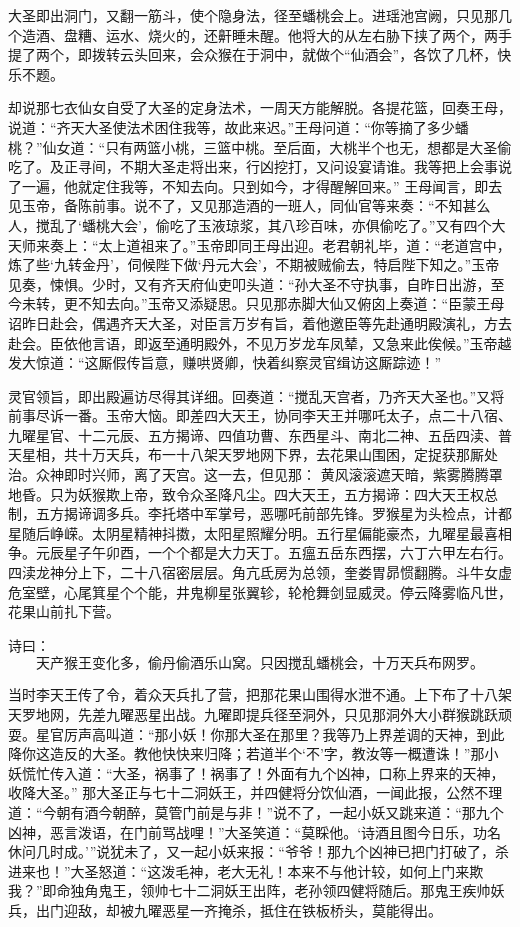 \documentclass[12pt]{lsbook}
\begin{document}
大圣即出洞门，又翻一筋斗，使个隐身法，径至蟠桃会上。进瑶池宫阙，只见那几个造酒、盘糟、运水、烧火的，还鼾睡未醒。他将大的从左右胁下挟了两个，两手提了两个，即拨转云头回来，会众猴在于洞中，就做个“仙酒会”，各饮了几杯，快乐不题。

却说那七衣仙女自受了大圣的定身法术，一周天方能解脱。各提花篮，回奏王母，说道：“齐天大圣使法术困住我等，故此来迟。”王母问道：“你等摘了多少蟠桃？”仙女道：“只有两篮小桃，三篮中桃。至后面，大桃半个也无，想都是大圣偷吃了。及正寻间，不期大圣走将出来，行凶挖打，又问设宴请谁。我等把上会事说了一遍，他就定住我等，不知去向。只到如今，才得醒解回来。” 王母闻言，即去见玉帝，备陈前事。说不了，又见那造酒的一班人，同仙官等来奏：“不知甚么人，搅乱了‘蟠桃大会’，偷吃了玉液琼浆，其八珍百味，亦俱偷吃了。”又有四个大天师来奏上：“太上道祖来了。”玉帝即同王母出迎。老君朝礼毕，道：“老道宫中，炼了些‘九转金丹’，伺候陛下做‘丹元大会’，不期被贼偷去，特启陛下知之。”玉帝见奏，悚惧。少时，又有齐天府仙吏叩头道：“孙大圣不守执事，自昨日出游，至今未转，更不知去向。”玉帝又添疑思。只见那赤脚大仙又俯囟上奏道：“臣蒙王母诏昨日赴会，偶遇齐天大圣，对臣言万岁有旨，着他邀臣等先赴通明殿演礼，方去赴会。臣依他言语，即返至通明殿外，不见万岁龙车凤辇，又急来此俟候。”玉帝越发大惊道：“这厮假传旨意，赚哄贤卿，快着纠察灵官缉访这厮踪迹！”

灵官领旨，即出殿遍访尽得其详细。回奏道：“搅乱天宫者，乃齐天大圣也。”又将前事尽诉一番。玉帝大恼。即差四大天王，协同李天王并哪吒太子，点二十八宿、九曜星官、十二元辰、五方揭谛、四值功曹、东西星斗、南北二神、五岳四渎、普天星相，共十万天兵，布一十八架天罗地网下界，去花果山围困，定捉获那厮处治。众神即时兴师，离了天宫。这一去，但见那： 黄风滚滚遮天暗，紫雾腾腾罩地昏。只为妖猴欺上帝，致令众圣降凡尘。四大天王，五方揭谛：四大天王权总制，五方揭谛调多兵。李托塔中军掌号，恶哪吒前部先锋。罗猴星为头检点，计都星随后峥嵘。太阴星精神抖擞，太阳星照耀分明。五行星偏能豪杰，九曜星最喜相争。元辰星子午卯酉，一个个都是大力天丁。五瘟五岳东西摆，六丁六甲左右行。四渎龙神分上下，二十八宿密层层。角亢氐房为总领，奎娄胃昴惯翻腾。斗牛女虚危室壁，心尾箕星个个能，井鬼柳星张翼轸，轮枪舞剑显威灵。停云降雾临凡世，花果山前扎下营。

诗曰： 
\[
天产猴王变化多，偷丹偷酒乐山窝。 

只因搅乱蟠桃会，十万天兵布网罗。 
\]

当时李天王传了令，着众天兵扎了营，把那花果山围得水泄不通。上下布了十八架天罗地网，先差九曜恶星出战。九曜即提兵径至洞外，只见那洞外大小群猴跳跃顽耍。星官厉声高叫道：“那小妖！你那大圣在那里？我等乃上界差调的天神，到此降你这造反的大圣。教他快快来归降；若道半个‘不’字，教汝等一概遭诛！”那小妖慌忙传入道：“大圣，祸事了！祸事了！外面有九个凶神，口称上界来的天神，收降大圣。” 那大圣正与七十二洞妖王，并四健将分饮仙酒，一闻此报，公然不理道：“今朝有酒今朝醉，莫管门前是与非！”说不了，一起小妖又跳来道：“那九个凶神，恶言泼语，在门前骂战哩！”大圣笑道：“莫睬他。‘诗酒且图今日乐，功名休问几时成。’”说犹未了，又一起小妖来报：“爷爷！那九个凶神已把门打破了，杀进来也！”大圣怒道：“这泼毛神，老大无礼！本来不与他计较，如何上门来欺我？”即命独角鬼王，领帅七十二洞妖王出阵，老孙领四健将随后。那鬼王疾帅妖兵，出门迎敌，却被九曜恶星一齐掩杀，抵住在铁板桥头，莫能得出。
\end{document}
